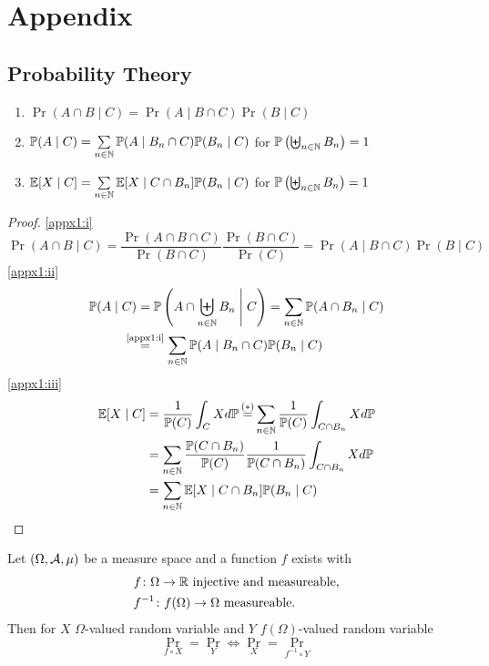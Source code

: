 \chapter{Appendix}
\section{Probability Theory}
\begin{lemma}\leavevmode \label{appx1}
    \begin{enumerate}[label=(\roman*), font=\normalfont]
        \item\label{appx1:i} \(\Pr(A\cap B\mid C) = \Pr(A \mid B \cap C)\Pr(B\mid C) \)
        \item\label{appx1:ii} \(\mathbb{P}(A\mid C)=\sum\limits_{n\in\mathbb{N}} \mathbb{P}(A \mid B_n \cap C)\mathbb{P}(B_n\mid C)  \)
        for  \(\mathbb{P}\left(\biguplus_{n\in\mathbb{N}}B_n\right)=1 \)
        \item\label{appx1:iii} \(\mathbb{E}[X\mid C]=\sum\limits_{n\in\mathbb{N}} \mathbb{E}[X\mid C \cap B_n] \mathbb{P}(B_n \mid C) \) for  \(\mathbb{P}\left(\biguplus_{n\in\mathbb{N}}B_n\right)=1 \)
    \end{enumerate}
\end{lemma}
\begin{proof}
    \ref{appx1:i}
    \[
        \Pr(A\cap B\mid C)
        =\frac{\Pr(A\cap B\cap C)}{\Pr(B\cap C)}\frac{\Pr(B\cap C)}{\Pr(C)}
        =\Pr(A\mid B\cap C)\Pr(B\mid C)
    \]
    \ref{appx1:ii}
    \begin{align*}
        \Pr(A\mid C)&=\Pr\left(A\cap \biguplus_{n\in\N} B_n \;\middle|\; C\right)
        =\sum_{n\in\N} \Pr(A\cap B_n\mid C)\\
        &\lxeq{\text{\ref{appx1:i}}} \sum_{n\in\N} \Pr(A \mid B_n \cap C)\Pr(B_n\mid C)
    \end{align*}
    \ref{appx1:iii}
    \begin{align*}
        \E[X\mid C]
        &=\frac{1}{\Pr(C)} \int_C X d\Pr 
        \xeq{(*)}\sum_{n\in\N}\frac{1}{\Pr(C)} \int_{C\cap B_n} X d\Pr\\
        &=\sum_{n\in\N} \frac{\Pr(C\cap B_n)}{\Pr(C)} \frac{1}{\Pr(C\cap B_n)} 
        \int_{C\cap B_n} X d\Pr \\
        &=\sum_{n\in\N}\E[X\mid C\cap B_n]\Pr(B_n\mid C) \qedhere
    \end{align*}

\end{proof}
\begin{lemma}\label{appx2}
    Let \((\Omega,\mathcal{A},\mu)\) be a measure space and a function \(f\) exists with
    \begin{align*}
        &f\colon \Omega \to \mathbb{R} \text{ injective and measureable,} \\
        &f^{-1}\colon f(\Omega)\to \Omega \text{ measureable.}
    \end{align*}
    Then for \(X\) \(\Omega\)-valued random variable and
    \(Y\) \(f(\Omega)\)-valued random variable
    \[
        \Pr_{f\circ X} =\Pr_Y \iff \Pr_X=\Pr_{f^{-1}\circ Y}
    \]
\end{lemma}
